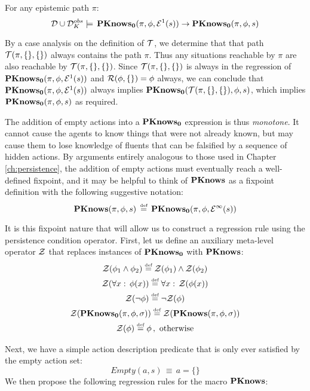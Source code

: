 \begin{thm}
\label{thm:En_impl_En-1}For any epistemic path $\pi$: \[
\mathcal{D}\cup\mathcal{D}_{K}^{obs}\models\,\mathbf{PKnows_{0}}(\pi,\phi,\mathcal{E}^{1}(s))\rightarrow\mathbf{PKnows_{0}}(\pi,\phi,s)\]

\end{thm}
\begin{proofsketch}
By a case analysis on the definition of $\mathcal{T}$, we determine that
that path $\mathcal{T}(\pi,\{\},\{\})$ always contains the path $\pi$.
Thus any situations reachable by $\pi$ are also reachable by $\mathcal{T}(\pi,\{\},\{\})$.
Since $\mathcal{T}(\pi,\{\},\{\})$ is always in the regression of $\mathbf{PKnows_{0}}(\pi,\phi,\mathcal{E}^{1}(s))$
and $\mathcal{R}(\phi,\{\})=\phi$ always, we can conclude that $\mathbf{PKnows_{0}}(\pi,\phi,\mathcal{E}^{1}(s))$
always implies $\mathbf{PKnows_{0}}(\mathcal{T}(\pi,\{\},\{\}),\phi,s)$, which implies
$\mathbf{PKnows_{0}}(\pi,\phi,s)$ as required. 
\end{proofsketch}
The addition of empty actions into a $\mathbf{PKnows_{0}}$ expression is thus
\emph{monotone}. It cannot cause the agents to know things that were
not already known, but may cause them to lose knowledge of fluents
that can be falsified by a sequence of hidden actions. By arguments
entirely analogous to those used in Chapter \ref{ch:persistence},
the addition of empty actions must eventually reach a well-defined
fixpoint, and it may be helpful to think of $\mathbf{PKnows}$ as a fixpoint
definition with the following suggestive notation:\[
\mathbf{PKnows}(\pi,\phi,s)\,\stackrel{\mbox{\tiny def}}{=}\,\mathbf{PKnows_{0}}(\pi,\phi,\mathcal{E}^{\infty}(s))\]


It is this fixpoint nature that will allow us to construct a regression
rule using the persistence condition operator. First, let us define
an auxiliary meta-level operator $\mathcal{Z}$ that replaces instances of
$\mathbf{PKnows_{0}}$ with $\mathbf{PKnows}$:\begin{gather*}
\mathcal{Z}(\phi_{1}\wedge\phi_{2})\stackrel{\mbox{\tiny def}}{=}\mathcal{Z}(\phi_{1})\wedge\mathcal{Z}(\phi_{2})\\
\mathcal{Z}(\forall x:\,\phi(x))\stackrel{\mbox{\tiny def}}{=}\forall x:\,\mathcal{Z}(\phi(x))\\
\mathcal{Z}(\neg\phi)\stackrel{\mbox{\tiny def}}{=}\neg\mathcal{Z}(\phi)\\
\mathcal{Z}(\mathbf{PKnows_{0}}(\pi,\phi,\sigma))\stackrel{\mbox{\tiny def}}{=}\mathcal{Z}(\mathbf{PKnows}(\pi,\phi,\sigma))\\
\mathcal{Z}(\phi)\stackrel{\mbox{\tiny def}}{=}\phi\,,\,\,\mathrm{otherwise}\end{gather*}


Next, we have a simple action description predicate that is only ever
satisfied by the empty action set:\[
Empty(a,s)\,\equiv\, a=\{\}\]
 We then propose the following regression rules for the macro $\mathbf{PKnows}$:

